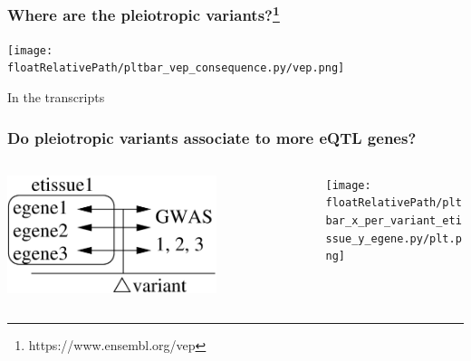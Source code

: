 \documentclass{beamer}
\newcommand*{\floatRelativePath}{../out/gwas417/pval_5e-08/r2_0.1/kb_1000/window_1000000/75_50}%
\begin{document}
    \begin{frame}
        \frametitle{Where are the pleiotropic variants?\footnote{https://www.ensembl.org/vep}}

        \begin{center}
            \texttt{[image: \\floatRelativePath/pltbar\_vep\_consequence.py/vep.png]}
        \end{center}

        In the transcripts


    \end{frame}

    \begin{frame}
        \frametitle{Do pleiotropic variants associate to more eQTL genes?}

        \begin{columns}
            \begin{column}{0.5\textwidth}
                \begin{center}
                    \includegraphics[width=0.7\textwidth]{../presentation_230120_gold2022_paris/fig/model_pleio_egenes.png}
                \end{center}
            \end{column}
            \begin{column}{0.5\textwidth}  %
                \begin{center}
                    \texttt{[image: \\floatRelativePath/pltbar\_x\_per\_variant\_etissue\_y\_egene.py/plt.png]}
                \end{center}
            \end{column}
        \end{columns}

    \end{frame}
\end{document}
